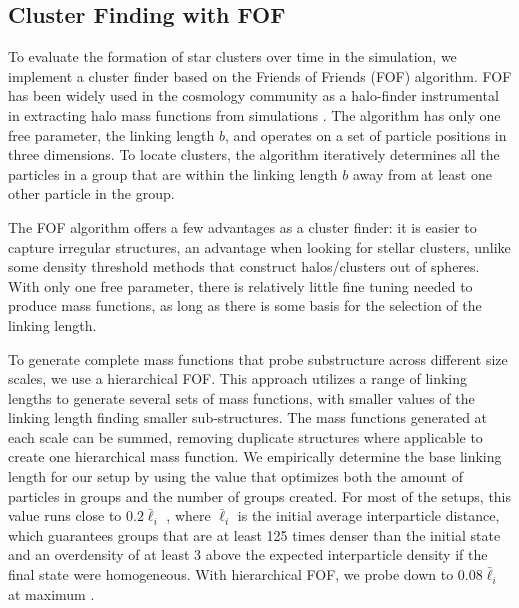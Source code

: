 \documentclass[iop]{emulateapj}
\begin{document}
\subsection{Cluster Finding with FOF}
\par To evaluate the formation of star clusters over time in the simulation, we implement a cluster finder based on the Friends of Friends (FOF) algorithm. FOF has been widely used in the cosmology community as a halo-finder instrumental in extracting  halo mass functions from simulations \citep{knebe11}. The algorithm has only one free parameter, the linking length $b$, and operates on a set of particle positions in three dimensions.
To locate clusters, the algorithm iteratively determines all the particles in a group that are within the linking length $b$ away from at least one other particle in the group. 
\par The FOF algorithm offers a few advantages as a cluster finder: it is easier to capture irregular structures, an advantage when looking for stellar clusters, unlike some density threshold methods that construct halos/clusters out of spheres. With only one free parameter, there is relatively little fine tuning needed to produce mass functions, as long as there is some basis for the selection of the linking length. 
\par To generate complete mass functions that probe substructure across different size scales, we use a hierarchical FOF. This approach utilizes a range of linking lengths to generate several sets of mass functions, with smaller values of the linking length finding smaller sub-structures. The mass functions generated at each scale can be summed, removing duplicate structures where applicable to create one hierarchical mass function. 
We empirically determine the base linking length for our setup by using the value that optimizes both the amount of particles in groups and the number of groups created.  For most of the setups, this value runs close to  $0.2 \bar{\ell}_i $ , where $\bar{\ell}_i$ is the initial average interparticle distance, which guarantees groups that are at least 125 times denser than the initial state and an overdensity of at least 3 above the expected interparticle density if the final state were homogeneous. With hierarchical FOF, we probe down to $0.08 \bar{\ell}_i$ at maximum .
\end{document}
